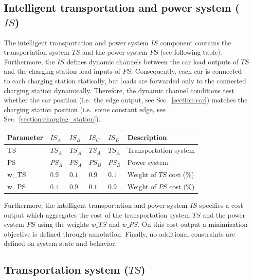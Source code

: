 \subsection{Intelligent transportation and power system ($IS$)}
\label{section:intelligent_system}

The intelligent transportation and power system $IS$ component contains the transportation system $TS$ and the power system $PS$ (see following table). Furthermore, the $IS$ defines dynamic channels between the car load outputs of $TS$ and the charging station load inputs of $PS$. Consequently, each car is connected to each charging station statically, but loads are forwarded only to the connected charging station dynamically. Therefore, the dynamic channel conditions test whether the car position (i.e.\ the edge output, see Sec.~\ref{section:car}) matches the charging station position (i.e.\ some constant edge, see Sec.~\ref{section:charging_station}).

\begin{table}[h]
	\renewcommand{\arraystretch}{1.3}
	\centering
	\begin{tabularx}{\columnwidth}{lllllX}
		\hline
		\textbf{Parameter}      & \textbf{$IS_{A}$} & \textbf{$IS_{B}$}  & \textbf{$IS_{C}$} & \textbf{$IS_{D}$}      & \textbf{Description} \\ \hline
		TS     					& $TS_{A}$   	& $TS_{A}$ & $TS_{A}$ & $TS_{A}$	 	& Transportation system     			\\
		PS               		& $PS_{A}$ 	& $PS_{A}$ & $PS_{B}$ & $PS_{B}$		& Power system   						\\
		w\_TS              & $0.9$  	& $0.1$ & $0.9$ & $0.1$		& Weight of $TS$ cost (\%)	\\ 
		w\_PS              & $0.1$  	& $0.9$ & $0.1$ & $0.9$  		& Weight of $PS$ cost (\%)   			\\ \hline
	\end{tabularx}
\end{table}

Furthermore, the intelligent transportation and power system $IS$ specifies a cost output which aggregates the cost of the transportation system $TS$ and the power system $PS$ using the weights $w\_TS$ and $w\_PS$. On this cost output a minimization objective is defined through annotation. Finally, no additional constraints are defined on system state and behavior.

\subsection{Transportation system ($TS$)}

